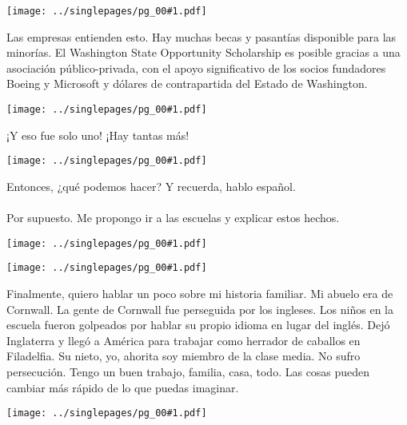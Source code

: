 \documentclass[12pt]{article}
\newcommand{\cue}{\mbox{}\\
  \fbox{\sf Next slide}
\\}
\newcommand{\fig}[1]{
  \newpage  
  \begin{center}
    \texttt{[image: ../singlepages/pg\_00\#1.pdf]}
  \end{center}
  
}
\begin{document}
\fig{17}

Las empresas entienden esto.  Hay muchas becas y pasantías disponible
para las minorías. El Washington State Opportunity Scholarship es
posible gracias a una asociación público-privada, con el apoyo
significativo de los socios fundadores Boeing y Microsoft y dólares de
contrapartida del Estado de Washington.



\fig{18}

¡Y eso fue solo uno!  ¡Hay tantas más!

\fig{20}

Entonces, ¿qué podemos hacer?  Y recuerda, hablo español.
\cue
Por supuesto.  Me propongo ir a las escuelas y explicar estos hechos. 

\fig{21}

\fig{22}

Finalmente, quiero hablar un poco sobre mi historia familiar.  Mi
abuelo era de Cornwall.  La gente de Cornwall fue perseguida por los
ingleses.  Los niños en la escuela fueron golpeados por hablar su
propio idioma en lugar del inglés.  Dejó Inglaterra y llegó a América
para trabajar como herrador de caballos en Filadelfia.  Su nieto, yo,
ahorita soy miembro de la clase media.  No sufro persecución.  Tengo
un buen trabajo, familia, casa, todo.  Las cosas pueden cambiar más
rápido de lo que puedas imaginar.

\fig{23}
\end{document}
